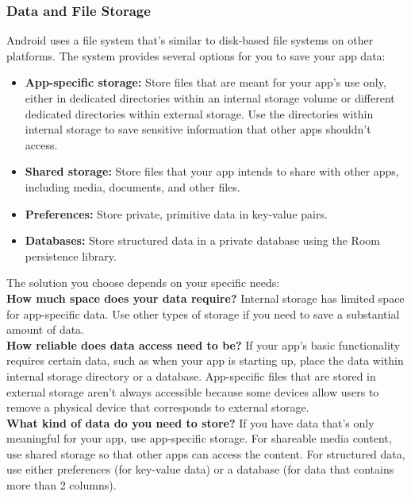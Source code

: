 \documentclass[14pt]{report}
\begin{document}
					\subsubsection{Data and File Storage}
					Android uses a file system that's similar to disk-based file systems on other platforms. The system provides several options for you to save your app data:
					\begin{itemize}
						\item \textbf{App-specific storage:} Store files that are meant for your app's use only, either in dedicated directories within an internal storage volume or different dedicated directories within external storage. Use the directories within internal storage to save sensitive information that other apps shouldn't access.
						\item \textbf{Shared storage:} Store files that your app intends to share with other apps, including media, documents, and other files.
						\item \textbf{Preferences:} Store private, primitive data in key-value pairs.
						\item \textbf{Databases:} Store structured data in a private database using the Room persistence library.
					\end{itemize}

					The solution you choose depends on your specific needs:\\

					\textbf{How much space does your data require?} Internal storage has limited space for app-specific data. Use other types of storage if you need to save a substantial amount of data.\\

					\textbf{How reliable does data access need to be?} If your app's basic functionality requires certain data, such as when your app is starting up, place the data within internal storage directory or a database. App-specific files that are stored in external storage aren't always accessible because some devices allow users to remove a physical device that corresponds to external storage.\\

					\textbf{What kind of data do you need to store?} If you have data that's only meaningful for your app, use app-specific storage. For shareable media content, use shared storage so that other apps can access the content. For structured data, use either preferences (for key-value data) or a database (for data that contains more than 2 columns).\\
					
\end{document}
